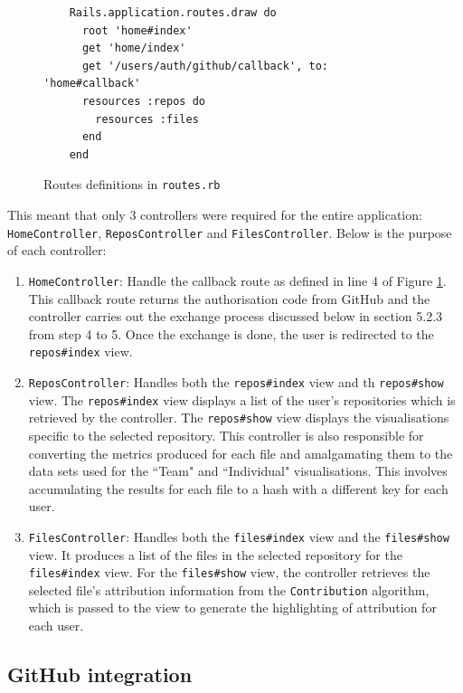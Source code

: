 \begin{figure}[h]
    \centering
    \begin{verbatim}
    Rails.application.routes.draw do
      root 'home#index'
      get 'home/index'
      get '/users/auth/github/callback', to: 'home#callback'
      resources :repos do
        resources :files
      end
    end
    \end{verbatim}
    \caption{Routes definitions in \texttt{routes.rb}}
    \label{fig:8}
\end{figure}

This meant that only 3 controllers were required for the entire application: \texttt{HomeController}, \texttt{ReposController} and \texttt{FilesController}. Below is the purpose of each controller:
\begin{enumerate}
    \item \texttt{HomeController}: Handle the callback route as defined in line 4 of Figure \ref{fig:8}. This callback route returns the authorisation code from GitHub and the controller carries out the exchange process discussed below in section 5.2.3 from step 4 to 5. Once the exchange is done, the user is redirected to the \texttt{repos\#index} view.
    \item \texttt{ReposController}: Handles both the \texttt{repos\#index} view and th \texttt{repos\#show} view. The \texttt{repos\#index} view displays a list of the user's repositories which is retrieved by the controller. The \texttt{repos\#show} view displays the visualisations specific to the selected repository. This controller is also responsible for converting the metrics produced for each file and amalgamating them to the data sets used for the ``Team" and ``Individual" visualisations. This involves accumulating the results for each file to a hash with a different key for each user.
    \item \texttt{FilesController}: Handles both the \texttt{files\#index} view and the \texttt{files\#show} view. It produces a list of the files in the selected repository for the \texttt{files\#index} view. For the \texttt{files\#show} view, the controller retrieves the selected file's attribution information from the \texttt{Contribution} algorithm, which is passed to the view to generate the highlighting of attribution for each user. 
\end{enumerate}

\subsection{GitHub integration}

